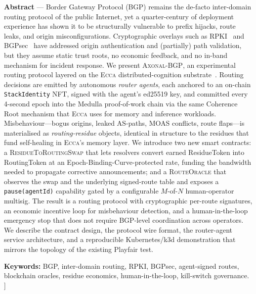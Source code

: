\documentclass[11pt,twocolumn]{article}
\theoremstyle{definition}
\theoremstyle{plain}
\theoremstyle{remark}
\newcommand{\ecca}{\textsc{Ecca}}
\newcommand{\axonal}{\textsc{Axonal-BGP}}
\newcommand{\contractname}[1]{\textsc{#1}}
\newcommand{\code}[1]{\texttt{#1}}
\begin{document}
\begin{center}
\parbox{0.92\textwidth}{
\textbf{\sffamily Abstract} ---
Border Gateway Protocol (BGP) remains the de-facto inter-domain routing protocol of the public Internet, yet a quarter-century of deployment experience has shown it to be structurally vulnerable to prefix hijacks, route leaks, and origin misconfigurations. Cryptographic overlays such as RPKI~\cite{rfc6480} and BGPsec~\cite{rfc8205} have addressed origin authentication and (partially) path validation, but they assume static trust roots, no economic feedback, and no in-band mechanism for incident response. We present \axonal{}, an experimental routing protocol layered on the \ecca{} distributed-cognition substrate~\cite{ecca2026}. Routing decisions are emitted by autonomous \emph{router agents}, each anchored to an on-chain \code{StackIdentity} NFT, signed with the agent's ed25519 key, and committed every 4-second epoch into the Medulla proof-of-work chain via the same Coherence Root mechanism that \ecca{} uses for memory and inference workloads. Misbehaviour---bogus origins, leaked AS-paths, MOAS conflicts, route flaps---is materialised as \emph{routing-residue} objects, identical in structure to the residues that fund self-healing in \ecca{}'s memory layer. We introduce two new smart contracts: a \contractname{ResidueToRoutingSwap} that lets resolvers convert earned ResidueToken into RoutingToken at an Epoch-Binding-Curve-protected rate, funding the bandwidth needed to propagate corrective announcements; and a \contractname{RouteOracle} that observes the swap and the underlying signed-route table and exposes a \code{pause(agentId)} capability gated by a configurable $M$-of-$N$ human-operator multisig. The result is a routing protocol with cryptographic per-route signatures, an economic incentive loop for misbehaviour detection, and a human-in-the-loop emergency stop that does not require BGP-level coordination across operators. We describe the contract design, the protocol wire format, the router-agent service architecture, and a reproducible Kubernetes/k3d demonstration that mirrors the topology of the existing Playfair test.
}
\end{center}
\vspace{1.5em}

\noindent\textbf{\sffamily Keywords:} BGP, inter-domain routing, RPKI, BGPsec, agent-signed routes, blockchain oracles, residue economics, human-in-the-loop, kill-switch governance.
\vspace{2em}
]
\end{document}

